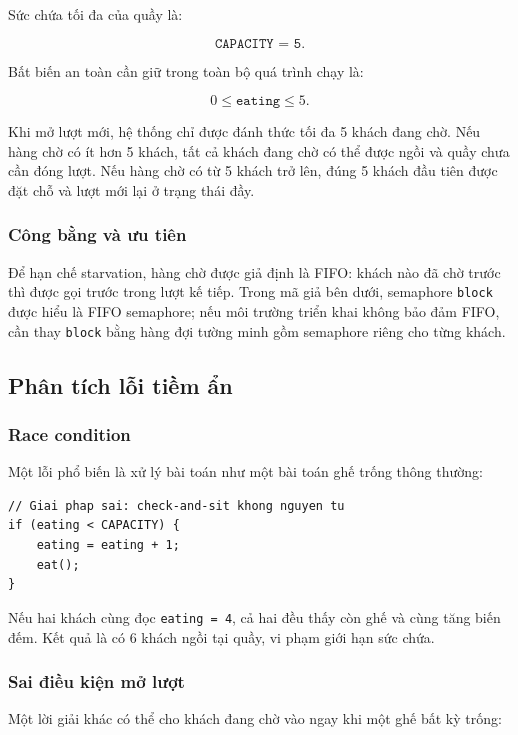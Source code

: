Sức chứa tối đa của quầy là:

\[
    \texttt{CAPACITY = 5}.
\]

Bất biến an toàn cần giữ trong toàn bộ quá trình chạy là:

\[
    0 \leq \texttt{eating} \leq 5.
\]

Khi mở lượt mới, hệ thống chỉ được đánh thức tối đa 5 khách đang chờ. Nếu hàng
chờ có ít hơn 5 khách, tất cả khách đang chờ có thể được ngồi và quầy chưa cần
đóng lượt. Nếu hàng chờ có từ 5 khách trở lên, đúng 5 khách đầu tiên được đặt
chỗ và lượt mới lại ở trạng thái đầy.

\subsubsection*{Công bằng và ưu tiên}

Để hạn chế starvation, hàng chờ được giả định là FIFO: khách nào đã chờ trước
thì được gọi trước trong lượt kế tiếp. Trong mã giả bên dưới, semaphore
\texttt{block} được hiểu là FIFO semaphore; nếu môi trường triển khai không
bảo đảm FIFO, cần thay \texttt{block} bằng hàng đợi tường minh gồm semaphore
riêng cho từng khách.

\subsection{Phân tích lỗi tiềm ẩn}

\subsubsection*{Race condition}

Một lỗi phổ biến là xử lý bài toán như một bài toán ghế trống thông thường:

\begin{lstlisting}
// Giai phap sai: check-and-sit khong nguyen tu
if (eating < CAPACITY) {
    eating = eating + 1;
    eat();
}
\end{lstlisting}

Nếu hai khách cùng đọc \texttt{eating = 4}, cả hai đều thấy còn ghế và cùng
tăng biến đếm. Kết quả là có 6 khách ngồi tại quầy, vi phạm giới hạn sức chứa.

\subsubsection*{Sai điều kiện mở lượt}

Một lời giải khác có thể cho khách đang chờ vào ngay khi một ghế bất kỳ trống:

